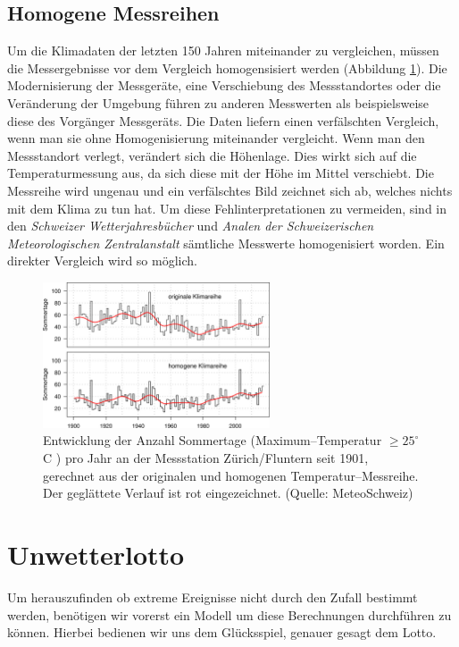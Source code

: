 \begin{refsection}
\subsection{Homogene Messreihen}
Um die Klimadaten der letzten 150 Jahren miteinander zu vergleichen, müssen die Messergebnisse vor dem Vergleich homogensisiert werden (Abbildung \ref{Homogen}). Die Modernisierung der Messgeräte,  eine Verschiebung des Messstandortes oder die Veränderung der Umgebung führen zu anderen Messwerten als beispielsweise diese des Vorgänger Messgeräts. Die Daten liefern einen verfälschten Vergleich, wenn man sie ohne Homogenisierung miteinander vergleicht.
Wenn man den Messstandort verlegt, verändert sich die Höhenlage. Dies wirkt sich auf die Temperaturmessung aus, da sich diese mit der Höhe im Mittel verschiebt. Die Messreihe wird ungenau und ein verfälschtes Bild zeichnet sich ab, welches nichts mit dem Klima zu tun hat.
Um diese Fehlinterpretationen zu vermeiden, sind in den \textit{Schweizer Wetterjahresbücher} und \textit{Analen der Schweizerischen Meteorologischen Zentralanstalt} sämtliche Messwerte homogenisiert worden. Ein direkter Vergleich wird so möglich.

\begin{figure}
\centering
\includegraphics[width=0.6\textwidth]{extrem/Homogen.jpg}
\caption{Entwicklung der Anzahl Sommertage (Maximum--Temperatur $\ge 25^{\circ}$C ) pro Jahr an der Messstation Zürich/Fluntern seit 1901, gerechnet aus der originalen und homogenen Temperatur--Messreihe. Der geglättete Verlauf ist rot eingezeichnet. (Quelle: MeteoSchweiz)}
\label{Homogen}
\end{figure}


\section{Unwetterlotto}
Um herauszufinden ob extreme Ereignisse nicht durch den Zufall bestimmt werden, benötigen wir vorerst ein Modell um diese Berechnungen durchführen zu können.
Hierbei bedienen wir uns dem Glücksspiel, genauer gesagt dem Lotto.


\end{refsection}
